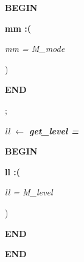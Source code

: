 \documentclass[11pt]{article}
\begin{document}
\begin{sloppypar}
\hspace*{0.20in}\bf BEGIN

\hspace*{0.40in}\bf mm \rm :\rm (

\hspace*{0.60in}\it mm \rm = \it M\_mode

\hspace*{0.60in}\rm )

\hspace*{0.20in}\bf END

\hspace*{0.20in}

\hspace*{0.20in}\rm ; 

\hspace*{0.20in}\it ll  $\leftarrow$ \hspace*{0.15in}\bf get\_level \rm = 

\hspace*{0.20in}\bf BEGIN

\hspace*{0.40in}\bf ll \rm :\rm (

\hspace*{0.60in}\it ll \rm = \it M\_level

\hspace*{0.60in}\rm )

\hspace*{0.20in}\bf END

\hspace*{0.40in}

\bf END

\newpage
\end{sloppypar}
\end{document}
